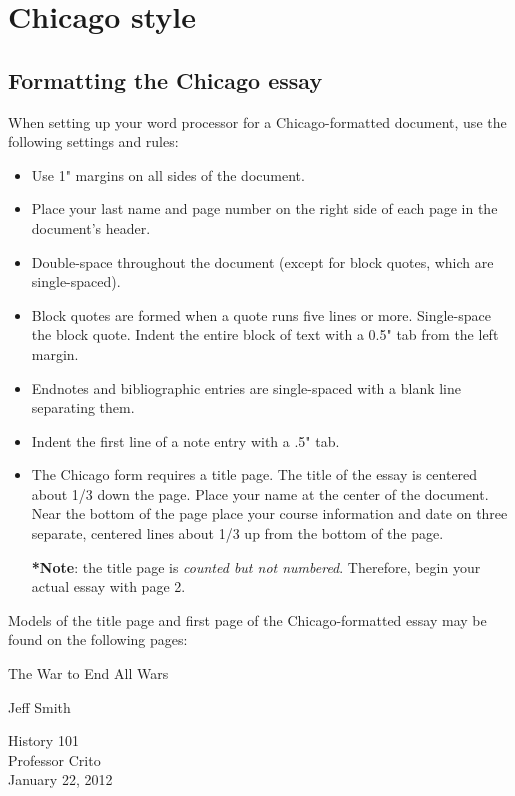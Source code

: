 

\chapter{Chicago style}

\section {Formatting the Chicago essay}

When setting up your word processor for a Chicago-formatted document, use the 
following settings and rules:

\begin{itemize}

\item Use 1" margins on all sides of the document.
\item Place your last name and page number on the right side of each page in the 
document's header.
\item Double-space throughout the document (except for block quotes, which are 
single-spaced).
\item Block quotes are formed when a quote runs five lines or more. Single-space the 
block quote. Indent the entire block of text with a 0.5" tab from the left margin.
\item Endnotes and bibliographic entries are single-spaced with a blank line separating 
them.
\item Indent the first line of a note entry with a .5" tab.
\item The Chicago form requires a title page. The title of the essay is centered about 
1/3 down the page. Place your name at the center of the document. Near the bottom 
of the page place your course information and date on three separate, centered lines 
about 1/3 up from the bottom of the page.

\textbf{*}\textbf{Note}: the title page is \emph{counted but not numbered}. Therefore, 
begin your actual essay with page 2.
\end{itemize}

Models of the title page and first page of the Chicago-formatted essay may be found on 
the following pages:

\newpage
\thispagestyle{empty}
\begin{Spacing}{2}
\vspace* {3cm}
\begin{center}The War to End All Wars\end{center}
\vspace {4cm}
\begin{center}Jeff Smith\end{center}
\vspace {5cm}
\begin{center}History 101\\
Professor Crito\\
January 22, 2012\end{center}
\end{Spacing}
\newpage

